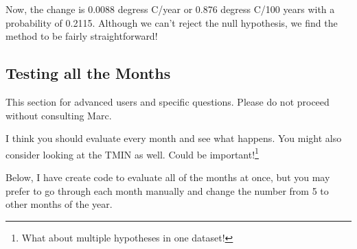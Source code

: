 \documentclass{article}\usepackage[]{graphicx}\usepackage[]{color}
\begin{document}
Now, the change is 0.0088 degress C/year or 0.876 degress C/100 years with a probability of 0.2115. Although we can't reject the null hypothesis, we find the method to be fairly straightforward! 


\subsection{Testing all the Months}

This section for advanced users and specific questions. Please do not proceed without consulting Marc.

I think you should evaluate every month and see what happens. You might also consider looking at the TMIN as well. Could be important!\footnote{What about multiple hypotheses in one dataset!}

Below, I have create code to evaluate all of the months at once, but you may prefer to go through each month manually and change the number from 5 to other months of the year. 
\end{document}
